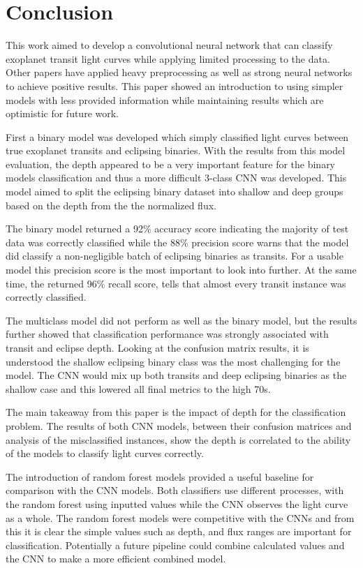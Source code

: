 \section{Conclusion} \label{sec:Further_Steps}

This work aimed to develop a convolutional neural network that can classify exoplanet transit light curves while applying limited processing to the data. Other papers have applied heavy preprocessing as well as strong neural networks to achieve positive results. This paper showed an introduction to using simpler models with less provided information while maintaining results which are optimistic for future work.

First a binary model was developed which simply classified light curves between true exoplanet transits and eclipsing binaries. With the results from this model evaluation, the depth appeared to be a very important feature for the binary models classification and thus a more difficult 3-class CNN was developed. This model aimed to split the eclipsing binary dataset into shallow and deep groups based on the depth from the the normalized flux. 

The binary model returned a 92\% accuracy score indicating the majority of test data was correctly classified while the 88\% precision score warns that the model did classify a non-negligible batch of eclipsing binaries as transits. For a usable model this precision score is the most important to look into further. At the same time, the returned 96\% recall score, tells that almost every transit instance was correctly classified. 

The multiclass model did not perform as well as the binary model, but the results further showed that classification performance was strongly associated with transit and eclipse depth. Looking at the confusion matrix results, it is understood the shallow eclipsing binary class was the most challenging for the model. The CNN would mix up both transits and deep eclipsing binaries as the shallow case and this lowered all final metrics to the high 70s.

The main takeaway from this paper is the impact of depth for the classification problem. The results of both CNN models, between their confusion matrices and analysis of the misclassified instances, show the depth is correlated to the ability of the models to classify light curves correctly. 

The introduction of random forest models provided a useful baseline for comparison with the CNN models. Both classifiers use different processes, with the random forest using inputted values while the CNN observes the light curve as a whole. The random forest models were competitive with the CNNs and from this it is clear the simple values such as depth, and flux ranges are important for classification. Potentially a future pipeline could combine calculated values and the CNN to make a more efficient combined model. 

